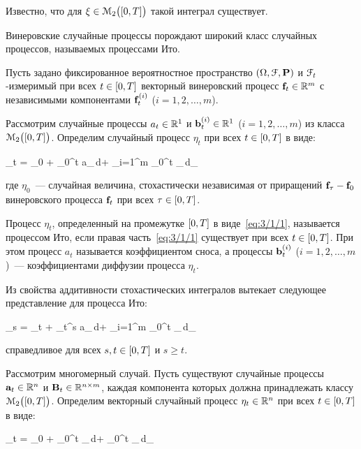 Известно, что для $\xi \in \mathcal{M}_2\bigl( [0, T] \bigr)$ такой интеграл существует\cite{KLOEDEN}.

\br

Винеровские случайные процессы порождают широкий класс случайных процессов, называемых процессами Ито.

Пусть задано фиксированное вероятностное пространство $(\Omega, \mathcal{F}, \mathbf{P})$ и $\mathcal{F}_t$-измеримый при всех $t \in [0, T]$ векторный винеровский процесс $\mathbf{f}_t \in \mathbb{R}^{m}$ с независимыми компонентами $\mathbf{f}_t^{(i)}$ ($i = 1, 2, \ldots, m$).

Рассмотрим случайные процессы $a_t \in \mathbb{R}^{1}$ и $\mathbf{b}_t^{(i)} \in \mathbb{R}^{1}$ ($i = 1, 2, \ldots, m$) из класса $\mathcal{M}_2\bigl( [0, T] \bigr)$. Определим случайный процесс $\eta_t$ при всех $t \in [0, T]$ в виде:

	\eta_t = \eta_0 + \int\limits_0^t a_\tau\,d\tau + \sum\limits_{i=1}^m \int\limits_0^t _\tau{}\,d_\tau{} \text{,}
\eeq

где $\eta_0$~--- случайная величина, стохастически независимая от приращений $\mathbf{f}_\tau-\mathbf{f}_0$ винеровского процесса $\mathbf{f}_t$ при всех $\tau \in [0, T]$.

\begin{df}
	Процесс $\eta_t$, определенный на промежутке $[0, T]$ в виде~\ref{eq:3/1/1}, называется процессом Ито, если правая часть~\ref{eq:3/1/1} существует при всех $t \in [0, T]$. При этом процесс $a_t$ называется коэффициентом сноса, а процессы $\mathbf{b}_t^{(i)}$ ($i = 1, 2, \ldots, m$)~--- коэффициентами диффузии процесса $\eta_t$.
\end{df}

Из свойства аддитивности стохастических интегралов вытекает следующее представление для процесса Ито:

	\eta_s = \eta_t + \int\limits_t^s a_\tau\,d\tau + \sum\limits_{i=1}^m \int\limits_0^t _\tau{}\,d_\tau{} 
\eeq

справедливое для всех $s, t \in [0, T]$ и $s \geqslant t$.

Рассмотрим многомерный случай. Пусть существуют случайные процессы $\mathbf{a}_t \in \mathbb{R}^{n}$ и $\mathbf{B}_t \in \mathbb{R}^{{n} \times {m}}$, каждая компонента которых должна принадлежать классу $\mathcal{M}_2\bigl( [0, T] \bigr)$. Определим векторный случайный процесс $\mathbf{\eta}_t \in \mathbb{R}^{n}$ при всех $t \in [0, T]$ в виде:

	\m{\eta}_t = \m{\eta}_0 + \int\limits_0^t _\tau\,d\tau + \int\limits_0^t _\tau\,d_\tau \text{,}
\eeq

